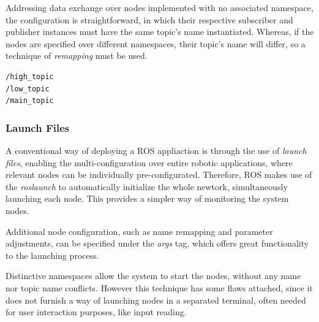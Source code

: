 Addressing data exchange over nodes implemented with no associated namespace, the configuration is straightforward, in which their respective subscriber and publisher instances must have the same topic's name instantiated. Whereas, if the nodes are specified over different namespaces, their topic's name will differ, so a technique of \textit{remapping} must be used.

\begin{lstlisting}[title={The \texttt{TurtleSim} topic list.}]
/high_topic
/low_topic
/main_topic
\end{lstlisting}



\subsubsection{Launch Files}

A conventional way of deploying a ROS appliaction is through the use of \textit{launch files}, enabling the multi-configuration over entire robotic applications, where relevant nodes can be individually pre-configurated. Therefore, ROS makes use of the \textit{roslaunch} to automatically initialize the whole newtork, simultaneously launching each node. This provides a simpler way of monitoring the system nodes.

Additional node configuration, such as name remapping and parameter adjustments, can be specified under the \textit{args} tag, which offers great functionality to the launching process. 

Distinctive namespaces allow the system to start the nodes, without any name nor topic name conflicts. However this technique has some flaws attached, since it does not furnish a way of launching nodes in a separated terminal, often needed for user interaction purposes, like input reading.



